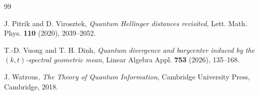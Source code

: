 \documentclass[11pt]{amsart}
\theoremstyle{definition}
\theoremstyle{remark}
\begin{document}
\begin{thebibliography}{99}
		
		J. Pitrik and D. Virosztek,
		\emph{Quantum Hellinger distances revisited},
		Lett. Math. Phys. \textbf{110} (2020), 2039--2052.
		
		T.-D. Vuong and T. H. Dinh,
		\emph{Quantum divergence and barycenter induced by the
			$(k,t)$-spectral geometric mean},
             Linear Algebra Appl. \textbf{753} (2026), 135--168.
		
		J. Watrous,
		\emph{The Theory of Quantum Information},
		Cambridge University Press, Cambridge, 2018.
		
	\end{thebibliography}
	
\end{document}
